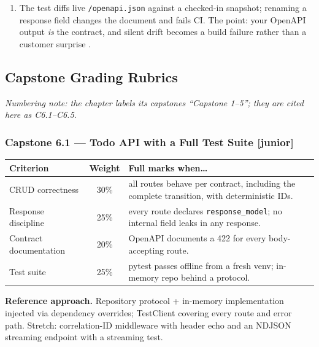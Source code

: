 \begin{enumerate}[label=\textbf{E\arabic*.}, leftmargin=2.2em]
    calls the repository's \texttt{close()} --- asserted by a flag on the
    repo. Uvicorn differs by being signal-driven: lifespan shutdown runs on
    SIGTERM during graceful shutdown (documented in uvicorn's lifespan
    section), so the same code path must be verified under a real server
    before production (Chapter~\ref{ch:deployment}).
  \item The test diffs live \texttt{/openapi.json} against a checked-in
    snapshot; renaming a response field changes the document and fails CI.
    The point: your OpenAPI output \emph{is} the contract, and silent drift
    becomes a build failure rather than a customer surprise
    \cite{openapi31}.
\end{enumerate}

\subsection{Capstone Grading Rubrics}

\emph{Numbering note: the chapter labels its capstones ``Capstone 1--5'';
they are cited here as C6.1--C6.5.}

\subsubsection*{Capstone 6.1 --- Todo API with a Full Test Suite [junior]}
\begin{center}\small
\begin{tabularx}{\textwidth}{l c X}
\toprule
\textbf{Criterion} & \textbf{Weight} & \textbf{Full marks when\ldots} \\
\midrule
CRUD correctness & 30\% & all routes behave per contract, including the complete transition, with deterministic IDs. \\
Response discipline & 25\% & every route declares \texttt{response\_model}; no internal field leaks in any response. \\
Contract documentation & 20\% & OpenAPI documents a 422 for every body-accepting route. \\
Test suite & 25\% & pytest passes offline from a fresh venv; in-memory repo behind a protocol. \\
\bottomrule
\end{tabularx}
\end{center}
\textbf{Reference approach.} Repository protocol + in-memory
implementation injected via dependency overrides; TestClient covering every
route and error path. Stretch: correlation-ID middleware with header echo
and an NDJSON streaming endpoint with a streaming test.

